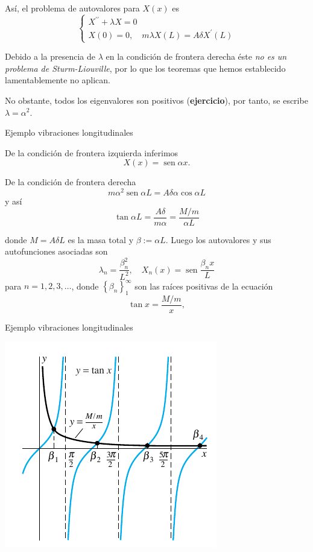 Así, el problema de autovalores para $X(x)$ es
$$
\left\{
\begin{array}{l}
X^{\prime \prime}+\lambda X=0 \\
X(0)=0, \quad m \lambda X(L)=A \delta X^{\prime}(L)
\end{array}
\right.
$$

Debido a la presencia de $\lambda$ en la condición de frontera derecha  éste \emph{no es un problema de Sturm-Liouville}, por lo que los teoremas que hemos establecido lamentablemente no aplican. 

No obstante, todos los eigenvalores  son positivos (\textbf{ejercicio}), por tanto, se escribe $\lambda=\alpha^{2}$.



 

 
{Ejemplo vibraciones longitudinales}

De la condición de frontera izquierda inferimos
$$X(x)=\operatorname{sen} \alpha x.$$ 


De la condición de frontera derecha 
$$
m \alpha^{2} \operatorname{sen} \alpha L=A \delta \alpha \cos \alpha L
$$
y así
$$
\tan \alpha L=\frac{A \delta}{m \alpha}=\frac{M / m}{\alpha L}
$$



donde  $M=A \delta L$ es la masa total y $\beta:=\alpha L$.
Luego  los autovalores y sus autofunciones asociadas son
$$
\lambda_{n}=\frac{\beta_{n}^{2}}{L^{2}}, \quad X_{n}(x)=\operatorname{sen} \frac{\beta_{n} x}{L}
$$
para $n=1,2,3, \ldots$, donde $\left\{\beta_{n}\right\}^{\infty}_1$ son las raíces positivas de la ecuación
$$
\tan x=\frac{M / m}{x},
$$

 

 
{Ejemplo vibraciones longitudinales}
\begin{center}
\includegraphics[scale=.8]{imagenes/barra3.png}
\end{center}

